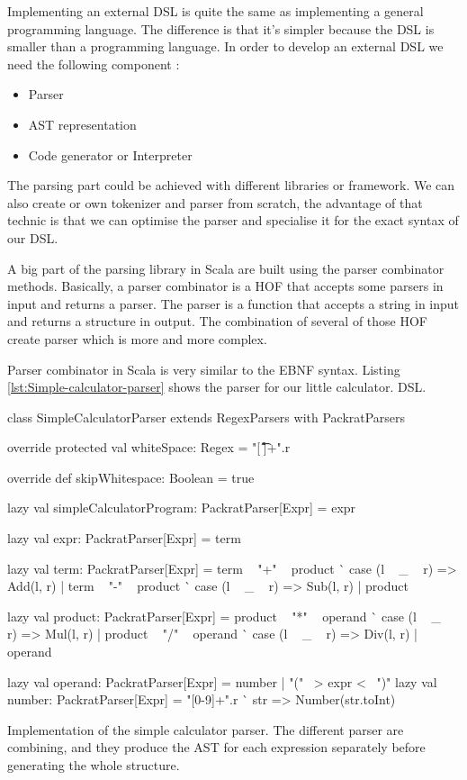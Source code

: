 Implementing an external \gls{DSL} is quite the same as implementing a general
programming language. The difference is that it’s simpler because the \gls{DSL}
is smaller than a programming language. In order to develop an external
\gls{DSL} we need the following component :

\begin{itemize}
\item Parser
\item \gls{AST} representation
\item Code generator or Interpreter
\end{itemize}


The parsing part could be achieved with different libraries or framework. We can
also create or own tokenizer and parser from scratch, the advantage of that
technic is that we can optimise the parser and specialise it for the exact
syntax of our \gls{DSL}.

A big part of the parsing library in Scala are built using the parser combinator
methods. Basically, a parser combinator is a \gls{HOF} that accepts
some parsers in input and returns a parser. The parser is a function that accepts
a string in input and returns a structure in output. The combination of several
of those \gls{HOF} create parser which is more and more complex.

Parser combinator in Scala is very similar to the \gls{EBNF} syntax. Listing
\ref{lst:Simple-calculator-parser} shows the parser for our little calculator.
\gls{DSL}.

\begin{listing}[ht]
\centering
\begin{scalacode}
class SimpleCalculatorParser extends RegexParsers with PackratParsers {
  override protected val whiteSpace: Regex = "[ \t\r\f\n]+".r

  override def skipWhitespace: Boolean = true

  lazy val simpleCalculatorProgram: PackratParser[Expr] = expr

  lazy val expr: PackratParser[Expr] = term

  lazy val term: PackratParser[Expr] = {
    term ~ "+" ~ product ^^ { case (l ~ _ ~ r) => Add(l, r) } |
      term ~ "-" ~ product ^^ { case (l ~ _ ~ r) => Sub(l, r) } |
      product
  }

  lazy val product: PackratParser[Expr] = {
    product ~ "*" ~ operand ^^ { case (l ~ _ ~ r) => Mul(l, r) } |
      product ~ "/" ~ operand ^^ { case (l ~ _ ~ r) => Div(l, r) } |
      operand
  }

  lazy val operand: PackratParser[Expr] = number | "(" ~> expr <~ ")"
  lazy val number: PackratParser[Expr] = "[0-9]+".r ^^ { str => Number(str.toInt) }
}
\end{scalacode}
\caption[Implementation of the simple calculator parser]{Implementation of the
simple calculator parser. The different parser are combining, and they produce
the \gls{AST} for each expression separately before generating the whole structure.}
\label{lst:Simple-calculator-parser}
\end{listing}

